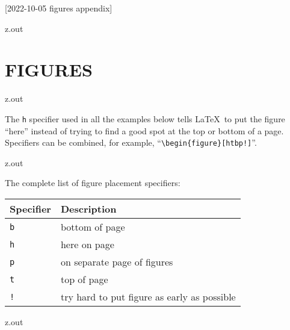 [2022-10-05 figures appendix]

\begin{VerbatimOut}{z.out}
\chapter{FIGURES}
\end{VerbatimOut}

\MyIO


\begin{VerbatimOut}{z.out}

The
\verb+h+
specifier used in all the examples below
tells \LaTeX\ to put the figure
``here''
instead of trying
to find a good spot
at the top or bottom of a page.
Specifiers can be combined,
for example,
``\verb+\begin{figure}[htbp!]+''.
\end{VerbatimOut}

\MyIO


\begin{VerbatimOut}{z.out}

The complete list of figure placement specifiers:
\vspace*{6pt}
\begin{center}
  \begin{tabular}{@{}ll@{}}
    \toprule
    \bf Specifier& \bf Description\\
    \midrule
    \noalign{\vspace*{2pt}}
    \tt b& bottom of page\\
    \tt h& here on page\\
    \tt p& on separate page of figures\\
    \tt t& top of page\\
    \tt !& try hard to put figure as early as possible\\
    \bottomrule
  \end{tabular}
\end{center}
\index{\verb+\begin{tabular}+}
\end{VerbatimOut}

\MyIO



\begin{VerbatimOut}{z.out}

\end{VerbatimOut}

